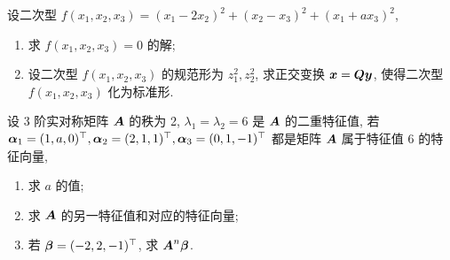 \begin{example}
    设二次型 $f(x_1,x_2,x_3)=(x_1-2x_2)^2+(x_2-x_3)^2+(x_1+ax_3)^2$,
    \begin{enumerate}[label=(\arabic{*})]
        \item 求 $f(x_1, x_2, x_3)=0$ 的解;
        \item 设二次型 $f(x_1, x_2, x_3)$ 的规范形为 $z_1^2, z_2^2$, 求正交变换 $\vb*{x}=\vb*{Qy}$, 使得二次型 $f(x_1, x_2, x_3)$ 化为标准形.
    \end{enumerate}
\end{example}
\begin{solution}

\end{solution}

\begin{example}
    设 3 阶实对称矩阵 $\vb*{A}$ 的秩为 2, $\lambda_1= \lambda_2=6$ 是 $\vb*{A}$ 的二重特征值, 若 $\vb*{\alpha}_1=(1,a,0)^\top,\vb*{\alpha}_2=(2,1,1)^\top,\vb*{\alpha}_3=(0,1,-1)^\top$ 都是矩阵 $\vb*{A}$ 属于特征值 6 的特征向量,
    \begin{enumerate}[label=(\arabic{*})]
        \item 求 $a$ 的值;
        \item 求 $\vb*{A}$ 的另一特征值和对应的特征向量;
        \item 若 $\vb*{\beta}=(-2,2,-1)^\top$, 求 $\vb*{A}^{n}\vb*{\beta}$.
    \end{enumerate}
\end{example}
